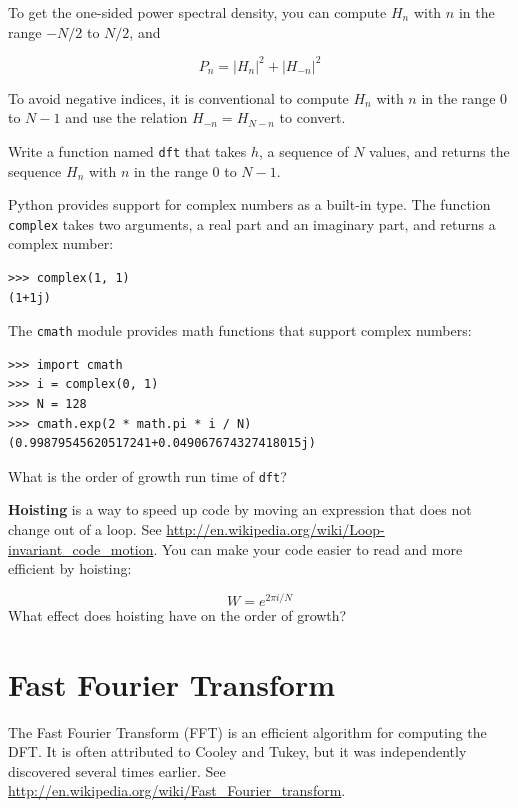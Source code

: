 \documentclass[10pt]{book}
\begin{document}
To get the one-sided power spectral density, you can compute $H_n$
with $n$ in the range $-N/2$ to $N/2$, and

\[ P_n = |H_n|^2 + |H_{-n}|^2 \]

To avoid negative indices, it is conventional to compute
$H_n$ with $n$ in the range $0$ to $N-1$ and use the relation
$H_{-n} = H_{N-n}$ to convert.

\begin{exercise}

Write a function named {\tt dft} that takes $h$, a sequence of $N$
values, and returns the sequence $H_n$ with $n$ in the range $0$ to
$N-1$.

Python provides support for complex numbers as a built-in type.
The function {\tt complex} takes two arguments, a real part
and an imaginary part, and returns a complex number:

\begin{verbatim}
>>> complex(1, 1)
(1+1j)
\end{verbatim}

The {\tt cmath} module provides math functions that support
complex numbers:

\begin{verbatim}
>>> import cmath
>>> i = complex(0, 1)
>>> N = 128
>>> cmath.exp(2 * math.pi * i / N)
(0.99879545620517241+0.049067674327418015j)

\end{verbatim}

What is the order of growth run time of {\tt dft}?

{\bf Hoisting} is a way to speed up code by moving an
expression that does not change out of a loop.
See \url{http://en.wikipedia.org/wiki/Loop-invariant_code_motion}.
You can make your code easier to read and more efficient
by hoisting:

\begin{equation}
W = e^{2 \pi i / N}
\end{equation}
%
What effect does hoisting have on the order of growth?

\end{exercise}


\section{Fast Fourier Transform}

The Fast Fourier Transform (FFT) is an efficient algorithm for
computing the DFT.  It is often attributed to Cooley and Tukey,
but it was independently discovered several times earlier.
See \url{http://en.wikipedia.org/wiki/Fast_Fourier_transform}.
\end{document}
